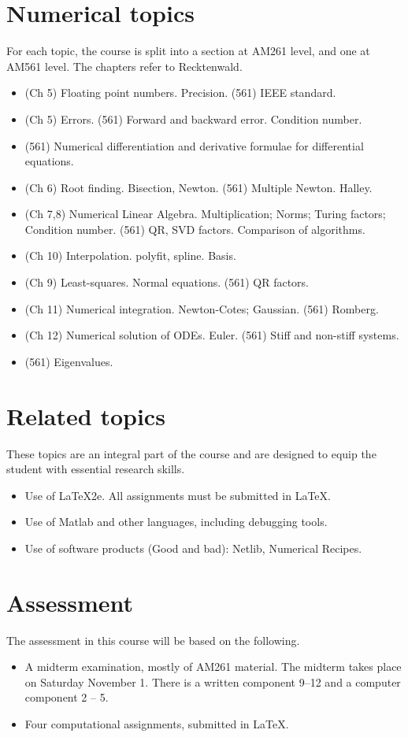 \documentclass{article}
\begin{document}
\section{Numerical topics}
For each topic, the course is split into a section at AM261 level, and one at AM561 level.
The chapters refer to Recktenwald.
\begin{itemize}
\item (Ch 5) Floating point numbers. Precision. (561) IEEE standard.
\item (Ch 5) Errors. (561) Forward and backward error. Condition number.
\item (561) Numerical differentiation and derivative formulae for differential equations.
\item (Ch 6) Root finding. Bisection, Newton. (561) Multiple Newton. Halley.
\item (Ch 7,8) Numerical Linear Algebra. Multiplication; Norms; Turing factors; Condition number.
(561) QR, SVD factors. Comparison of algorithms.
\item (Ch 10) Interpolation. polyfit, spline. Basis.
\item (Ch 9) Least-squares. Normal equations. (561) QR factors.
\item (Ch 11) Numerical integration. Newton-Cotes; Gaussian. (561) Romberg.
\item (Ch 12) Numerical solution of ODEs. Euler. (561) Stiff and non-stiff systems.
\item (561) Eigenvalues.
\end{itemize}

\section{Related topics}
These topics are an integral part of the course and are designed to equip the student
with essential research skills.
\begin{itemize}
\item Use of \LaTeX2e. All assignments must be submitted in \LaTeX.
\item Use of Matlab and other languages, including debugging tools.
\item Use of software products (Good and bad):  Netlib, Numerical Recipes.
\end{itemize}

\section{Assessment}
The assessment in this course will be based on the following.
\begin{itemize}
\item A midterm examination, mostly of AM261 material. The midterm takes place on
Saturday November 1. There is a written component 9--12 and a computer component 2 -- 5.
\item Four computational assignments, submitted in \LaTeX.
\end{itemize}
\end{document}

